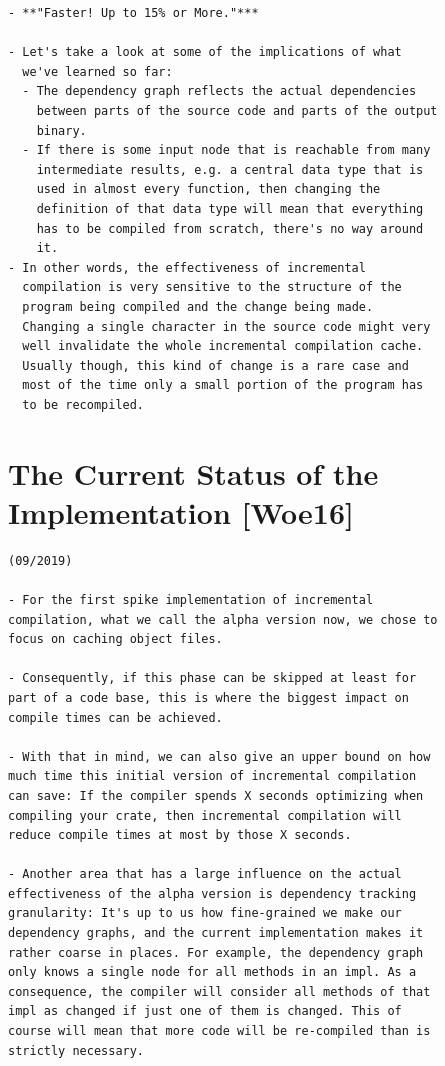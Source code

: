 \documentclass[12pt, a4paper]{report}
\begin{document}
\begin{verbatim}
- **"Faster! Up to 15% or More."***

- Let's take a look at some of the implications of what
  we've learned so far:
  - The dependency graph reflects the actual dependencies
    between parts of the source code and parts of the output
    binary.
  - If there is some input node that is reachable from many
    intermediate results, e.g. a central data type that is
    used in almost every function, then changing the
    definition of that data type will mean that everything
    has to be compiled from scratch, there's no way around
    it.
- In other words, the effectiveness of incremental
  compilation is very sensitive to the structure of the
  program being compiled and the change being made.
  Changing a single character in the source code might very
  well invalidate the whole incremental compilation cache.
  Usually though, this kind of change is a rare case and
  most of the time only a small portion of the program has
  to be recompiled.
\end{verbatim}
\cite{rust_blog_incremental_compilation}

\section*{The Current Status of the Implementation [Woe16]}

\begin{verbatim}
(09/2019)

- For the first spike implementation of incremental
compilation, what we call the alpha version now, we chose to
focus on caching object files.

- Consequently, if this phase can be skipped at least for
part of a code base, this is where the biggest impact on
compile times can be achieved.

- With that in mind, we can also give an upper bound on how
much time this initial version of incremental compilation
can save: If the compiler spends X seconds optimizing when
compiling your crate, then incremental compilation will
reduce compile times at most by those X seconds.

- Another area that has a large influence on the actual
effectiveness of the alpha version is dependency tracking
granularity: It's up to us how fine-grained we make our
dependency graphs, and the current implementation makes it
rather coarse in places. For example, the dependency graph
only knows a single node for all methods in an impl. As a
consequence, the compiler will consider all methods of that
impl as changed if just one of them is changed. This of
course will mean that more code will be re-compiled than is
strictly necessary.
\end{verbatim}
\cite{rust_blog_incremental_compilation}
\end{document}
